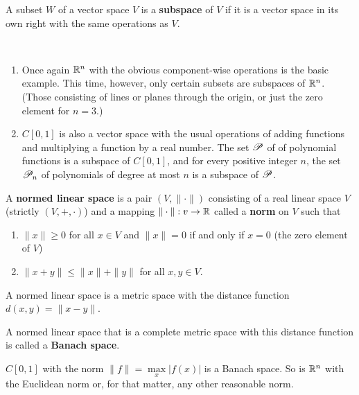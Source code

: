 \begin{defn}%
	A subset $W$ of a vector space $V$ is a \textbf{subspace} of $V$ if it is a 
	vector space in its own right with the same operations as $V$. 
\end{defn}

\pagebreak
\begin{ex}~ %
	\begin{enumerate}
	\item Once again $\mathbb{R}^n$ with the obvious component-wise operations is the 
		basic example. This time, however, only certain subsets are subspaces 
		of $\mathbb{R}^n$. (Those consisting of lines or planes through the origin, or 
		just the zero element for $n = 3$.)
	\item $C[0,1]$ is also a vector space with the usual operations of adding functions 
		and multiplying a function by a real number. The set $\mathscr{P}$ of of polynomial 
		functions is a subspace of $C[0,1]$, and for every positive integer $n$, 
		the set $\mathscr{P}_n$ of polynomials of degree at most $n$ is a subspace of $\mathscr{P}$.  
	\end{enumerate}
\end{ex}

\begin{defn}%
	A \textbf{normed linear space} is a pair $(V, \|\cdot\|)$ consisting of a real 
	linear space $V$ (strictly $(V,+,\cdot)$) and a mapping $\|\cdot\|:v\rightarrow \mathbb{R}$ 
	called a \textbf{norm} on $V$ such that 
	\begin{enumerate}
	\item $\|x\|\ge 0$ for all $x\in V$ and $\|x\|=0$ if and only if $x = 0$ (the zero 
		element of $V$)
	\item $\|x+y\|\le\|x\|+\|y\|$ for all $x,y\in V$. 
	\end{enumerate}
\end{defn}

\begin{rmk} %
	A normed linear space is a metric space with the distance function $d(x,y) = \|x-y\|$. 
\end{rmk}

\begin{defn}%
	A normed linear space that is a complete metric space with this distance function is 
	called a \textbf{Banach space}. 
\end{defn}

\begin{ex}%
	$C[0,1]$ with the norm $\|f\|=\max\limits_{x}|f(x)|$ is a Banach space. So is $\mathbb{R}^n$ 
	with the Euclidean norm or, for that matter, any other reasonable norm. 
\end{ex}


